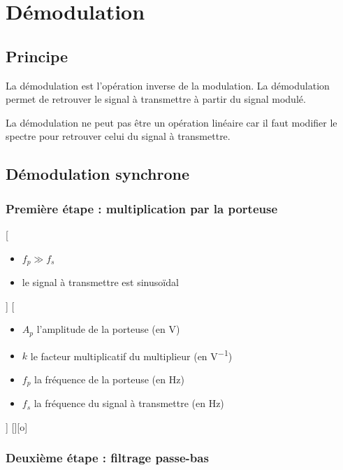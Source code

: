 \section{Démodulation}
\subsection{Principe}

La démodulation est l'opération inverse de la modulation. La démodulation permet de retrouver le signal à transmettre à partir du signal modulé.

La démodulation ne peut pas être un opération linéaire car il faut modifier le spectre pour retrouver celui du signal à transmettre.

\subsection{Démodulation synchrone}

\subsubsection{Première étape : multiplication par la porteuse}

[
  \begin{itemize}
    \item $f_p \gg f_s$
    \item le signal à transmettre est sinusoïdal
  \end{itemize}
]
{\schema{}{3cm}}
[
  \begin{itemize}
    \item $A_p$ l'amplitude de la porteuse (en \unit{V})
    \item $k$ le facteur multiplicatif du multiplieur (en \unit{V^{-1}})
    \item $f_p$ la fréquence de la porteuse (en \unit{Hz})
    \item $f_s$ la fréquence du signal à transmettre (en \unit{Hz})
  \end{itemize}
]
[][o]


\subsubsection{Deuxième étape : filtrage passe-bas}

